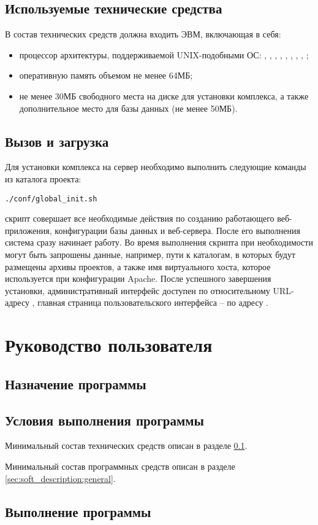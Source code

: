 

\subsection{Используемые технические средства}
\label{sec:soft_description:tech}

В состав технических средств должна входить ЭВМ, включающая в себя:
\begin{itemize}
    \item процессор архитектуры, поддерживаемой UNIX-подобными ОС: , , , , , , , , ;
    \item оперативную память объемом не менее 64МБ;
    \item не менее 30МБ свободного места на диске для установки комплекса, а также дополнительное место для базы данных (не менее 50МБ).
\end{itemize}

\subsection{Вызов и загрузка}

Для установки комплекса на сервер необходимо выполнить следующие команды из каталога проекта:

\begin{lscommand}\verb+./conf/global_init.sh+\end{lscommand}

 скрипт совершает все необходимые действия по созданию работающего веб-приложения, конфигурации базы данных и веб-сервера. После его выполнения система сразу начинает работу. Во время выполнения скрипта при необходимости могут быть запрошены данные, например, пути к каталогам, в которых будут размещены архивы проектов, а также имя виртуального хоста, которое используется при конфигурации Apache. После успешного завершения установки, административный интерфейс доступен по относительному URL-адресу , главная страница пользовательского интерфейса -- по адресу \Code{/}.

\section{Руководство пользователя}
\label{sec:man}

\subsection{Назначение программы}


\subsection{Условия выполнения программы}

Минимальный состав технических средств описан в разделе \ref{sec:soft_description:tech}.

Минимальный состав программных средств описан в разделе \ref{sec:soft_description:general}.

\subsection{Выполнение программы}



